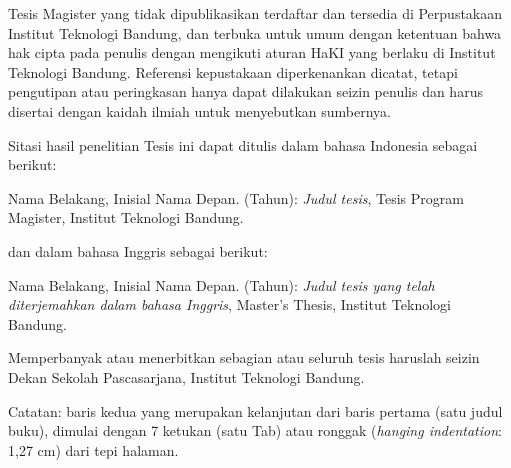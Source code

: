 \documentclass{itb-thesis}
\begin{document}
\cover


\approvalpage


\thesisguide

Tesis Magister yang tidak dipublikasikan terdaftar dan tersedia di Perpustakaan Institut Teknologi Bandung, dan terbuka untuk umum dengan ketentuan bahwa hak cipta pada penulis dengan mengikuti aturan HaKI yang berlaku di Institut Teknologi Bandung. Referensi kepustakaan diperkenankan dicatat, tetapi pengutipan atau peringkasan hanya dapat dilakukan seizin penulis dan harus disertai dengan kaidah ilmiah untuk menyebutkan sumbernya.

\vspace{14pt}

Sitasi hasil penelitian Tesis ini dapat ditulis dalam bahasa Indonesia sebagai berikut:

\begin{hangparas}{1.27cm}{1}
Nama Belakang, Inisial Nama Depan. (Tahun): \textit{Judul tesis}, Tesis Program Magister, Institut Teknologi Bandung.
\end{hangparas}

\vspace{14pt}

dan dalam bahasa Inggris sebagai berikut:

\vspace{14pt}

\begin{hangparas}{1.27cm}{1}
Nama Belakang, Inisial Nama Depan. (Tahun): \textit{Judul tesis yang telah diterjemahkan dalam bahasa Inggris}, Master's Thesis, Institut Teknologi Bandung.
\end{hangparas}

\vspace{14pt}

Memperbanyak atau menerbitkan sebagian atau seluruh tesis haruslah seizin Dekan Sekolah Pascasarjana, Institut Teknologi Bandung.

\vspace{14pt}

Catatan: baris kedua yang merupakan kelanjutan dari baris pertama (satu judul buku), dimulai dengan 7 ketukan (satu Tab) atau ronggak (\textit{hanging indentation}: 1,27 cm) dari tepi halaman.
\end{document}
